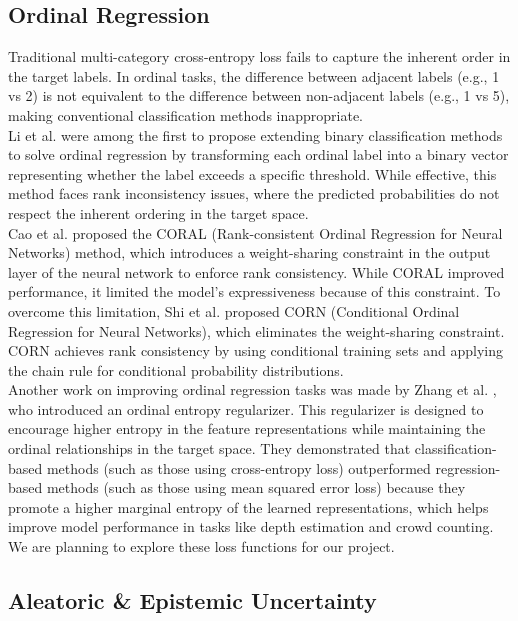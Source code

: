 \documentclass{report}
\begin{document}
\subsection{Ordinal Regression}
Traditional multi-category cross-entropy loss fails to capture the inherent order in the target labels. In ordinal tasks, the difference between adjacent labels (e.g., 1 vs 2) is not equivalent to the difference between non-adjacent labels (e.g., 1 vs 5), making conventional classification methods inappropriate.\\
Li et al. \cite{li2006ordinal} were among the first to propose extending binary classification methods to solve ordinal regression by transforming each ordinal label into a binary vector representing whether the label exceeds a specific threshold. While effective, this method faces rank inconsistency issues, where the predicted probabilities do not respect the inherent ordering in the target space.\\
Cao et al. \cite{cao2020rank} proposed the CORAL (Rank-consistent Ordinal Regression for Neural Networks) method, which introduces a weight-sharing constraint in the output layer of the neural network to enforce rank consistency. While CORAL improved performance, it limited the model's expressiveness because of this constraint.
To overcome this limitation, Shi et al. \cite{ordinal_regr1} proposed CORN (Conditional Ordinal Regression for Neural Networks), which eliminates the weight-sharing constraint. CORN achieves rank consistency by using conditional training sets and applying the chain rule for conditional probability distributions. \\
Another work on improving ordinal regression tasks was made by Zhang et al. \cite{zhang2023improvingdeepregressionordinal}, who introduced an ordinal entropy regularizer. This regularizer is designed to encourage higher entropy in the feature representations while maintaining the ordinal relationships in the target space. They demonstrated that classification-based methods (such as those using cross-entropy loss) outperformed regression-based methods (such as those using mean squared error loss) because they promote a higher marginal entropy of the learned representations, which helps improve model performance in tasks like depth estimation and crowd counting.\\
We are planning to explore these loss functions for our project.

\subsection{Aleatoric \& Epistemic Uncertainty}
\end{document}
